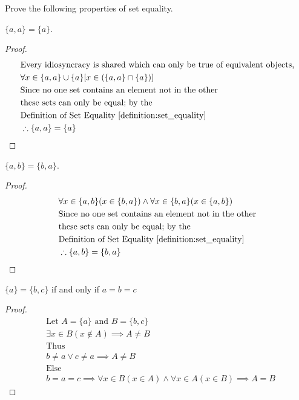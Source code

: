 \begin{question}
  Prove the following properties of set equality.

  \begin{subquestion}
    $\{a, a\} = \{ a \}$.
  \end{subquestion}
  \begin{proof}
    \begin{align*}
      & \text{Every idiosyncracy is shared which can only be true of equivalent objects,} \\
      & \forall x \in \{a, a\} \cup \{ a \} [x \in (\{a, a\} \cap \{ a \})] \\
      & \text{Since no one set contains an element not in the other} \\
      & \text{these sets can only be equal; by the} \\
      & \text{Definition of Set Equality \ref{definition:set_equality}} \\
      & \therefore \{a, a\} = \{ a \}
    \end{align*}
  \end{proof}

  \begin{subquestion}
    $\{a, b\} = \{b, a\}$.
  \end{subquestion}
  \begin{proof}
    \begin{align*}
      & \forall x \in \{a, b\}(x \in \{b, a\}) \land \forall x \in \{b, a\}(x \in \{a, b\}) \\
      & \text{Since no one set contains an element not in the other} \\
      & \text{these sets can only be equal; by the} \\
      & \text{Definition of Set Equality \ref{definition:set_equality}} \\
      & \therefore \{a, b\} = \{b, a\}
    \end{align*}
  \end{proof}

  \begin{subquestion}
    $\{a\} = \{b, c\}$ if and only if $a = b = c$
  \end{subquestion}
  \begin{proof}
    \begin{align*}
      & \text{Let } A = \{a\} \text{ and } B = \{b, c\} \\
      & \exists x \in B (x \not \in A) \implies A \neq B \\
      & \text{Thus} \\
      & b \neq a \lor c \neq a \implies A \neq B \\
      & \text{Else} \\
      & b = a = c \implies \forall x \in B (x \in A) \land \forall x \in A (x \in B) \implies A = B
    \end{align*}
  \end{proof}

\end{question}

